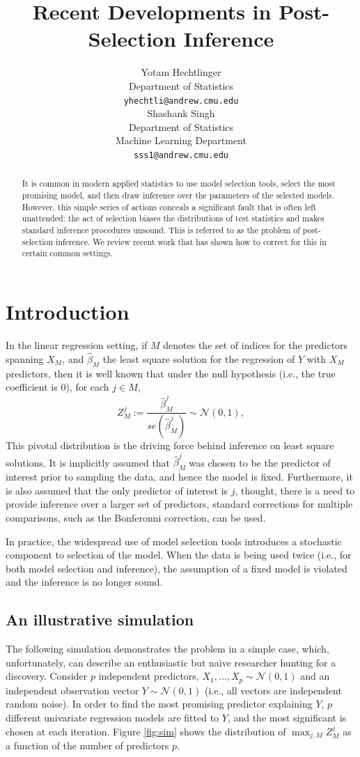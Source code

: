 \documentclass{article}
\title{Recent Developments in Post-Selection Inference}
\author{
Yotam Hechtlinger\\
Department of Statistics\\
\texttt{yhechtli@andrew.cmu.edu} \\
\And
Shashank Singh \\
Department of Statistics \\
Machine Learning Department \\
\texttt{sss1@andrew.cmu.edu} \\
}
\newcommand{\Nrm}{\mathcal{N}}
\renewcommand{\hat}{\widehat}
\begin{document}
\maketitle

\begin{abstract}
It is common in modern applied statistics to use model selection tools, select
the most promising model, and then draw inference over the parameters of the
selected models. However, this simple series of actions conceals a significant
fault that is often left unattended: the act of selection biases the
distributions of test statistics and makes standard inference procedures
unsound. This is referred to as the problem of post-selection inference. We
review recent work that has shown how to correct for this in certain common
settings.
\end{abstract}

\section{Introduction}
In the linear regression setting, if $M$ denotes the set of indices for the
predictors spanning $X_M$, and $\hat\beta_M$ the least square
solution for the regression of $Y$ with $X_{M}$ predictors, then it is well
known that under the null hypothesis (i.e., the true coefficient is $0$), for
each $j \in M$,
\[Z_M^j
    := \frac{\hat\beta_M^j}{se\left(\hat\beta_M^j\right)}
    \sim \Nrm(0, 1),\]
This pivotal distribution is the driving force behind inference on least square
solutions. It is implicitly assumed that $\hat\beta_M^j$ was chosen to be the
predictor of interest prior to sampling the data, and hence the model is fixed.
Furthermore, it is also assumed that the only predictor of interest is $j$,
thought, there is a need to provide inference over a larger set of predictors,
standard corrections for multiple comparisons, such as the Bonferonni
correction, can be used.

In practice, the widespread use of model selection tools introduces a
stochastic component to selection of the model. When the data is being used
twice (i.e., for both model selection and inference), the assumption of a fixed
model is violated and the inference is no longer sound.

\subsection{An illustrative simulation}
The following simulation demonstrates the problem in a simple case, which,
unfortunately, can describe an enthusiastic but naive researcher hunting for a
discovery. Consider $p$ independent predictors,
$X_1,\ldots,X_p \sim \Nrm(0, 1)$ and an independent observation vector
$Y\sim\mathcal{N}\left(0,1\right)$ (i.e., all vectors are independent random
noise). In order to find the most promising predictor explaining $Y$, $p$
different univariate regression models are fitted to $Y$, and the most
significant is chosen at each iteration. Figure \ref{fig:sim} shows the
distribution of $\max_{j,M} Z_M^j$ as a function of the number of predictors
$p$. 
\end{document}
